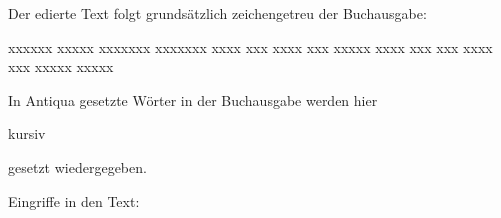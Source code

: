 

Der edierte Text folgt grundsätzlich zeichengetreu der Buchausgabe:

xxxxxx xxxxx xxxxxxx xxxxxxx xxxx xxx xxxx xxx xxxxx xxxx xxx xxx xxxx
xxx xxxxx xxxxx

In Antiqua gesetzte Wörter in der
Buchausgabe werden hier \begin{it}kursiv\end{it} gesetzt wiedergegeben.

Eingriffe in den Text:

\theendnotes
